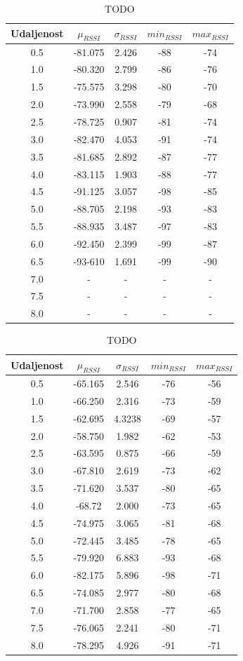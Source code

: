 \begin{table}[H]
	\centering
	\caption{TODO}
	\label{tbl:indoorKontaktDefaultTx}
	\begin{tabular}{ccccc}
	\hline
	Udaljenost & $\mu_{RSSI}$ & $\sigma_{RSSI}$ & $min_{RSSI}$ & $max_{RSSI}$ \\
	\hline
	0.5 & -81.075 & 2.426 & -88 & -74 \\
	1.0 & -80.320 & 2.799 & -86 & -76 \\
	1.5 & -75.575 & 3.298 & -80 & -70 \\
	2.0 & -73.990 & 2.558 & -79 & -68 \\
	2.5 & -78.725 & 0.907 & -81 & -74 \\
	3.0 & -82.470 & 4.053 & -91 & -74 \\
	3.5 & -81.685 & 2.892 & -87 & -77 \\
	4.0 & -83.115 & 1.903 & -88 & -77 \\
	4.5 & -91.125 & 3.057 & -98 & -85 \\
	5.0 & -88.705 & 2.198 & -93 & -83 \\
	5.5 & -88.935 & 3.487 & -97 & -83 \\
	6.0 & -92.450 & 2.399 & -99 & -87 \\
	6.5 & -93-610 & 1.691 & -99 & -90 \\
	7.0 & - & - & - & - \\
	7.5 & - & - & - & - \\
	8.0 & - & - & - & - \\
	\hline
	\end{tabular}
\end{table}

\begin{table}
	\centering
	\caption{TODO}
	\label{tbl:indoorKontaktMaxTx}
	\begin{tabular}{ccccc}
	\hline 
	Udaljenost & $\mu_{RSSI}$ & $\sigma_{RSSI}$ & $min_{RSSI}$ & $max_{RSSI}$ \\ 
	\hline 
	0.5 & -65.165 & 2.546 & -76 & -56 \\
	1.0 & -66.250 & 2.316 & -73 & -59 \\
	1.5 & -62.695 & 4.3238 & -69 & -57 \\
	2.0 & -58.750 & 1.982 & -62 & -53 \\
	2.5 & -63.595 & 0.875 & -66 & -59 \\
	3.0 & -67.810 & 2.619 & -73 & -62 \\
	3.5 & -71.620 & 3.537 & -80 & -65 \\
	4.0 & -68.72 & 2.000 & -73 & -65 \\
	4.5 & -74.975 & 3.065 & -81 & -68 \\
	5.0 & -72.445 & 3.485 & -78 & -65 \\
	5.5 & -79.920 & 6.883 & -93 & -68 \\
	6.0 & -82.175 & 5.896 & -98 & -71 \\
	6.5 & -74.085 & 2.977 & -80 & -68 \\
	7.0 & -71.700 & 2.858 & -77 & -65 \\
	7.5 & -76.065 & 2.241 & -80 & -71 \\
	8.0 & -78.295 & 4.926 & -91 & -71 \\
	\hline
	\end{tabular}
\end{table}


